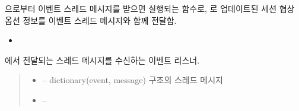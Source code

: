 \documentclass[a4paper,10pt,english]{sphinxmanual}
\begin{document}
\begin{fulllineitems}
\begin{fulllineitems}
\label{\detokenize{_SessionManager:SessionManager._srUpdateNegotiationOptions}}
\pysigstartsignatures
{}
\pysigstopsignatures
\sphinxAtStartPar
{\hyperref[\detokenize{_DHDaemon:dhdaemon}]{}} 으로부터  이벤트 스레드 메시지를 받으면 실행되는 함수로,
{\hyperref[\detokenize{_SessionRequester:sessionrequester}]{}} 로 업데이트된 세션 협상 옵션 정보를  이벤트 스레드 메시지와 함께 전달함.


\nopagebreak

\begin{itemize}
\item {} 
\sphinxAtStartPar
{\hyperref[\detokenize{_SessionRequester:SessionRequester._smListener}]{}}

\end{itemize}



\end{fulllineitems}


\begin{fulllineitems}
\label{\detokenize{_SessionManager:SessionManager._vcListener}}
\pysigstartsignatures
{}
\pysigstopsignatures
\sphinxAtStartPar
{} 에서 전달되는 스레드 메시지를 수신하는 이벤트 리스너.
\begin{quote}\begin{description}
\begin{itemize}
\item {} 
\sphinxAtStartPar
{} – dictionary(event, message) 구조의 스레드 메시지

\item {} 
\sphinxAtStartPar
{} – 


\end{itemize}
\end{description}
\end{quote}
\end{fulllineitems}
\end{fulllineitems}
\end{document}
